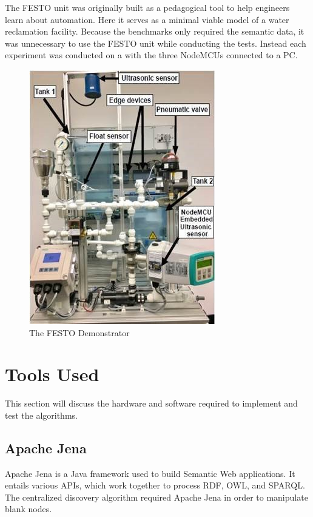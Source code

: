 The FESTO unit was originally built as a pedagogical tool to help engineers learn about automation. Here it serves as a minimal viable model of a water reclamation facility. Because the benchmarks only required the semantic data, it was unnecessary to use the FESTO unit while conducting the tests. Instead each experiment was conducted on a with the three NodeMCUs connected to a PC.

\begin{figure}[th]
\centering
\includegraphics[width=.7\textwidth]{Figures/festoDemonstrator.jpg}
\caption{The FESTO Demonstrator}
\label{fig:festoDem}
\end{figure}



\section{Tools Used}
This section will discuss the hardware and software required to implement and test the algorithms.

\subsection{Apache Jena}

Apache Jena is a Java framework used to build Semantic Web applications. It entails various APIs, which work together to process RDF, OWL, and SPARQL. The centralized discovery algorithm required Apache Jena in order to manipulate blank nodes.

